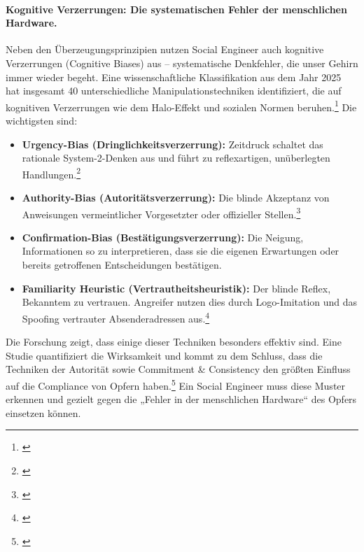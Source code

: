 \documentclass[10pt,a4paper]{article}
\begin{document}
	\paragraph{Kognitive Verzerrungen: Die systematischen Fehler der menschlichen Hardware.}
	Neben den Überzeugungsprinzipien nutzen Social Engineer auch kognitive Verzerrungen (Cognitive Biases) aus – systematische Denkfehler, die unser Gehirn immer wieder begeht. Eine wissenschaftliche Klassifikation aus dem Jahr 2025 hat insgesamt 40 unterschiedliche Manipulationstechniken identifiziert, die auf kognitiven Verzerrungen wie dem Halo-Effekt und sozialen Normen beruhen.\footnote{\cite{DalmiereClassification}} Die wichtigsten sind:
	\begin{itemize}
		\item \textbf{Urgency-Bias (Dringlichkeitsverzerrung):} Zeitdruck schaltet das rationale System-2-Denken aus und führt zu reflexartigen, unüberlegten Handlungen.\footnote{\cite{DiesecPhishing}}
		\item \textbf{Authority-Bias (Autoritätsverzerrung):} Die blinde Akzeptanz von Anweisungen vermeintlicher Vorgesetzter oder offizieller Stellen.\footnote{\cite{DiesecPhishing}}
		\item \textbf{Confirmation-Bias (Bestätigungsverzerrung):} Die Neigung, Informationen so zu interpretieren, dass sie die eigenen Erwartungen oder bereits getroffenen Entscheidungen bestätigen.
		\item \textbf{Familiarity Heuristic (Vertrautheitsheuristik):} Der blinde Reflex, Bekanntem zu vertrauen. Angreifer nutzen dies durch Logo-Imitation und das Spoofing vertrauter Absenderadressen aus.\footnote{\cite{DiesecPhishing}}
	\end{itemize}
	Die Forschung zeigt, dass einige dieser Techniken besonders effektiv sind. Eine Studie quantifiziert die Wirksamkeit und kommt zu dem Schluss, dass die Techniken der Autorität sowie Commitment \& Consistency den größten Einfluss auf die Compliance von Opfern haben.\footnote{\cite{SuspiciousMinds}} Ein Social Engineer muss diese Muster erkennen und gezielt gegen die „Fehler in der menschlichen Hardware“ des Opfers einsetzen können.
	
\end{document}
